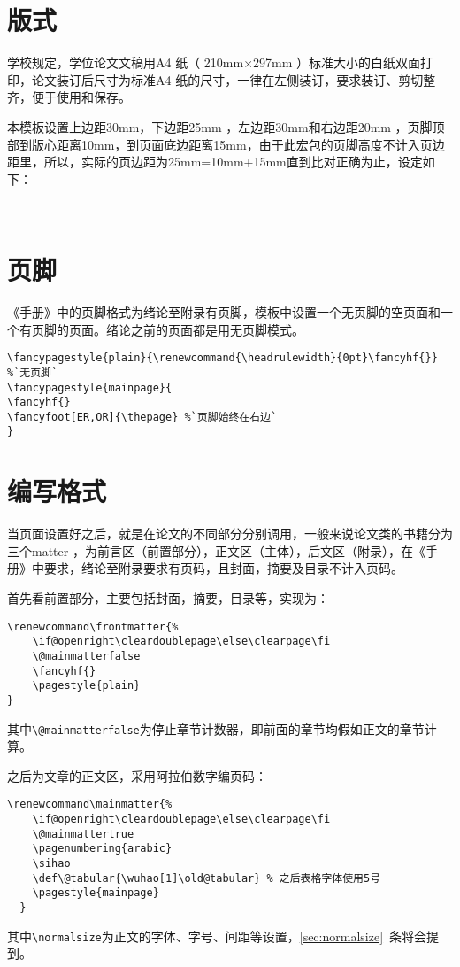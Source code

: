 \section{版式}
学校规定，学位论文文稿用A4 纸（ 210mm×297mm ）标准大小的白纸双面打印，论文装订后尺寸为标准A4 纸的尺寸，一律在左侧装订，要求装订、剪切整齐，便于使用和保存。

本模板设置上边距30mm，下边距25mm ，左边距30mm和右边距20mm ，页脚顶部到版心距离10mm，到页面底边距离15mm，由于此宏包的页脚高度不计入页边距里，所以，实际的页边距为25mm=10mm+15mm直到比对正确为止，设定如下：

{\\}

\section{页脚}
《手册》中的页脚格式为绪论至附录有页脚，模板中设置一个无页脚的空页面和一个有页脚的页面。绪论之前的页面都是用无页脚模式。
\begin{lstlisting}
\fancypagestyle{plain}{\renewcommand{\headrulewidth}{0pt}\fancyhf{}} %`无页脚`
\fancypagestyle{mainpage}{
\fancyhf{}
\fancyfoot[ER,OR]{\thepage} %`页脚始终在右边`
} 
\end{lstlisting}

\section{编写格式}
当页面设置好之后，就是在论文的不同部分分别调用，一般来说论文类的书籍分为三个matter ，为前言区（前置部分），正文区（主体），后文区（附录），在《手册》中要求，绪论至附录要求有页码，且封面，摘要及目录不计入页码。

首先看前置部分，主要包括封面，摘要，目录等，实现为：
\begin{lstlisting}
\renewcommand\frontmatter{%
    \if@openright\cleardoublepage\else\clearpage\fi
    \@mainmatterfalse
	\fancyhf{}
    \pagestyle{plain}
}
\end{lstlisting}
其中\verb|\@mainmatterfalse|为停止章节计数器，即前面的章节均假如正文的章节计算。

之后为文章的正文区，采用阿拉伯数字编页码：
\begin{lstlisting}
\renewcommand\mainmatter{%
    \if@openright\cleardoublepage\else\clearpage\fi
    \@mainmattertrue
    \pagenumbering{arabic}
    \sihao
    \def\@tabular{\wuhao[1]\old@tabular} % 之后表格字体使用5号
    \pagestyle{mainpage}
  }
\end{lstlisting}
其中\verb|\normalsize|为正文的字体、字号、间距等设置，\ref{sec:normalsize}~条将会提到。

